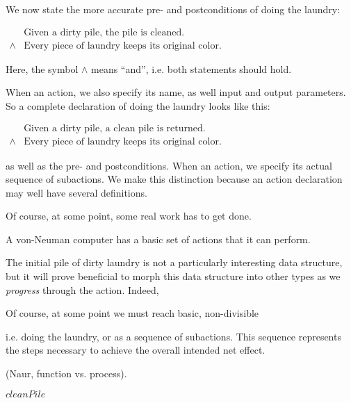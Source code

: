 We now state the more accurate pre- and postconditions of doing the laundry:

\begin{codebox}
\zi
$\begin{array}{ll}
&\text{Given a dirty pile, the pile is cleaned.}\\
\wedge&\text{Every piece of laundry keeps its original color.}
\end{array}$
\end{codebox}

Here, the symbol $\wedge$ means ``and'', i.e. both statements should hold.

When  an action, we also specify its name, as well input and
output parameters. So a complete declaration of doing the laundry looks like
this:

\begin{codebox}
\zi
$\begin{array}{ll}
&\text{Given a dirty pile, a clean pile is returned.}\\
\wedge&\text{Every piece of laundry keeps its original color.}
\end{array}$
\end{codebox}



as well as the pre- and postconditions. When 
an action, we specify its actual sequence of subactions. We make this
distinction because an action declaration may well have several definitions.

Of course, at some point, some real work has to get done.

A von-Neuman computer has a basic set of actions that it can perform.


The initial pile of dirty laundry is not a particularly interesting data
structure, but it will prove beneficial to morph this data structure into other
types as we \emph{progress} through the action. Indeed, 

Of course, at some point we must reach basic, non-divisible 


 i.e.  doing
the laundry, or as a sequence of subactions. This sequence represents the steps
necessary to achieve the overall intended net effect.


(Naur,
function vs. process).

\begin{codebox}
\li \Return $cleanPile$
\end{codebox}

